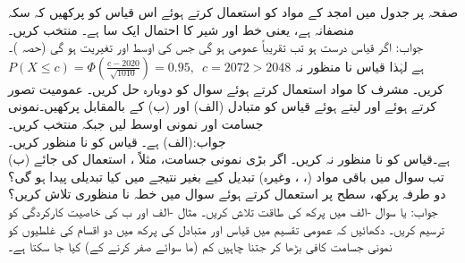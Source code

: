 \quad 
صفحہ  پر جدول  میں امجد کے مواد کو استعمال کرتے ہوئے اس قیاس کو پرکھیں کہ سکہ منصفانہ ہے، یعنی خط اور شیر کا احتمال ایک سا ہے۔ منتخب کریں۔\\
جواب:\quad
اگر قیاس  درست ہو تب  تقریباً عمومی ہو گی جس کی اوسط  اور تغیریت  ہو گی (حصہ )۔\\
$P(X\le c)=\Phi(\tfrac{c-2020}{\sqrt{1010}})=0.95,\,\,\,c=2072>2048$
ہے لہٰذا قیاس نا منظور نہ کریں۔
\quad
مشرف کا مواد استعمال کرتے ہوئے سوال  کو دوبارہ حل کریں۔
\quad
عمومیت تصور کرتے ہوئے اور  لیتے ہوئے قیاس  کو متبادل (الف)  اور (ب)  کے بالمقابل پرکھیں۔نمونی جسامت  اور نمونی اوسط  لیں جبکہ  منتخب کریں۔\\
جواب:\quad (الف)  ہے۔ قیاس کو نا منظور کریں۔\\
(ب)  ہے۔قیاس کو نا منظور نہ کریں۔
\quad
اگر بڑی نمونی جسامت، مثلاً ، استعمال کی جائے تب سوال  میں باقی مواد (، ، وغیرہ) تبدیل کیے بغیر نتیجے میں کیا تبدیلی پیدا ہو گی؟ 
\quad
دو طرفہ پرکھ،  سطح پر استعمال کرتے ہوئے سوال  میں خطہ نا منظوری تلاش کریں؟\\
جواب:\quad {} یا 
\quad
سوال -الف میں پرکھ کی طاقت تلاش کریں۔
\quad
مثال -الف اور ب کی خاصیت کارکردگی کو ترسیم کریں۔  
\quad
دکھائیں کہ عمومی تقسیم میں قیاس  اور متبادل  کی پرکھ میں  دو اقسام کی غلطیوں کو نمونی جسامت کافی بڑھا کر  جتنا چاہیں کم (ما سوائے صفر کرنے کے) کیا جا سکتا ہے۔
